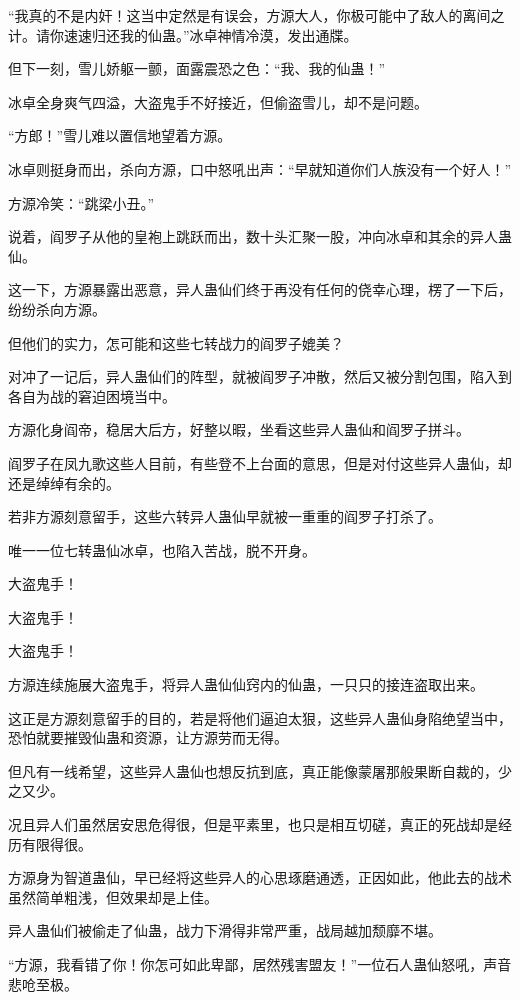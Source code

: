 \begin{this_body}
“我真的不是内奸！这当中定然是有误会，方源大人，你极可能中了敌人的离间之计。请你速速归还我的仙蛊。”冰卓神情冷漠，发出通牒。

但下一刻，雪儿娇躯一颤，面露震恐之色：“我、我的仙蛊！”

冰卓全身爽气四溢，大盗鬼手不好接近，但偷盗雪儿，却不是问题。

“方郎！”雪儿难以置信地望着方源。

冰卓则挺身而出，杀向方源，口中怒吼出声：“早就知道你们人族没有一个好人！”

方源冷笑：“跳梁小丑。”

说着，阎罗子从他的皇袍上跳跃而出，数十头汇聚一股，冲向冰卓和其余的异人蛊仙。

这一下，方源暴露出恶意，异人蛊仙们终于再没有任何的侥幸心理，楞了一下后，纷纷杀向方源。

但他们的实力，怎可能和这些七转战力的阎罗子媲美？

对冲了一记后，异人蛊仙们的阵型，就被阎罗子冲散，然后又被分割包围，陷入到各自为战的窘迫困境当中。

方源化身阎帝，稳居大后方，好整以暇，坐看这些异人蛊仙和阎罗子拼斗。

阎罗子在凤九歌这些人目前，有些登不上台面的意思，但是对付这些异人蛊仙，却还是绰绰有余的。

若非方源刻意留手，这些六转异人蛊仙早就被一重重的阎罗子打杀了。

唯一一位七转蛊仙冰卓，也陷入苦战，脱不开身。

大盗鬼手！

大盗鬼手！

大盗鬼手！

方源连续施展大盗鬼手，将异人蛊仙仙窍内的仙蛊，一只只的接连盗取出来。

这正是方源刻意留手的目的，若是将他们逼迫太狠，这些异人蛊仙身陷绝望当中，恐怕就要摧毁仙蛊和资源，让方源劳而无得。

但凡有一线希望，这些异人蛊仙也想反抗到底，真正能像蒙屠那般果断自裁的，少之又少。

况且异人们虽然居安思危得很，但是平素里，也只是相互切磋，真正的死战却是经历有限得很。

方源身为智道蛊仙，早已经将这些异人的心思琢磨通透，正因如此，他此去的战术虽然简单粗浅，但效果却是上佳。

异人蛊仙们被偷走了仙蛊，战力下滑得非常严重，战局越加颓靡不堪。

“方源，我看错了你！你怎可如此卑鄙，居然残害盟友！”一位石人蛊仙怒吼，声音悲呛至极。


\end{this_body}
